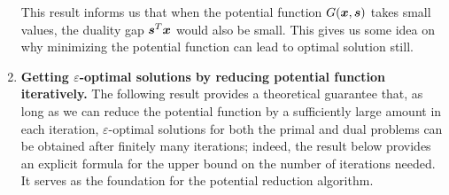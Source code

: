 \begin{enumerate}
\begin{note}
This result informs us that when the potential function
\(G(\bm{x},\bm{s})\) takes small values, the duality gap
\(\bm{s}^{T}\bm{x}\) would also be small. This gives us some idea on why
minimizing the potential function can lead to optimal solution still.
\end{note}
\item \textbf{Getting \(\varepsilon\)-optimal solutions by reducing potential
function iteratively.}
The following result provides a theoretical guarantee that, as long as we can
reduce the potential function by a sufficiently large amount in each iteration,
\(\varepsilon\)-optimal solutions for both the primal and dual problems can be
obtained after finitely many iterations; indeed, the result below provides an
explicit formula for the upper bound on the number of iterations needed. It
serves as the foundation for the potential reduction algorithm.


\end{enumerate}
